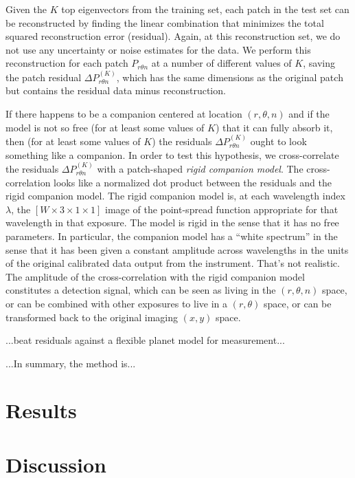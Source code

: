 \documentclass[12pt,pdftex,preprint]{aastex}
\begin{document}
Given the $K$ top eigenvectors from the training set, each patch in
the test set can be reconstructed by finding the linear combination
that minimizes the total squared reconstruction error (residual).
Again, at this reconstruction set, we do not use any uncertainty or
noise estimates for the data.  We perform this reconstruction for each
patch $P_{r \theta n}$ at a number of different values of $K$, saving
the patch residual $\Delta P^{(K)}_{r \theta n}$, which has the same
dimensions as the original patch but contains the residual data minus
reconstruction.

If there happens to be a companion centered at location $(r, \theta,
n)$ and if the model is not so free (for at least some values of $K$)
that it can fully absorb it, then (for at least some values of $K$)
the residuals $\Delta P^{(K)}_{r \theta n}$ ought to look something like a
companion.  In order to test this hypothesis, we cross-correlate the
residuals $\Delta P^{(K)}_{r \theta n}$ with a patch-shaped \emph{rigid
  companion model}.  The cross-correlation looks like a normalized dot
product between the residuals and the rigid companion model.  The
rigid companion model is, at each wavelength index $\lambda$, the
$[W\times 3\times 1\times 1]$ image of the point-spread function
appropriate for that wavelength in that exposure.  The model is rigid
in the sense that it has no free parameters.  In particular, the
companion model has a ``white spectrum'' in the sense that it has been
given a constant amplitude across wavelengths in the units of the
original calibrated data output from the instrument.  That's not
realistic.  The amplitude of the cross-correlation with the rigid
companion model constitutes a detection signal, which can be seen as
living in the $(r, \theta ,n)$ space, or can be combined with other
exposures to live in a $(r, \theta)$ space, or can be transformed back
to the original imaging $(x, y)$ space.

...beat residuals against a flexible planet model for measurement...

...In summary, the method is...

\section{Results}

\section{Discussion}
\end{document}
